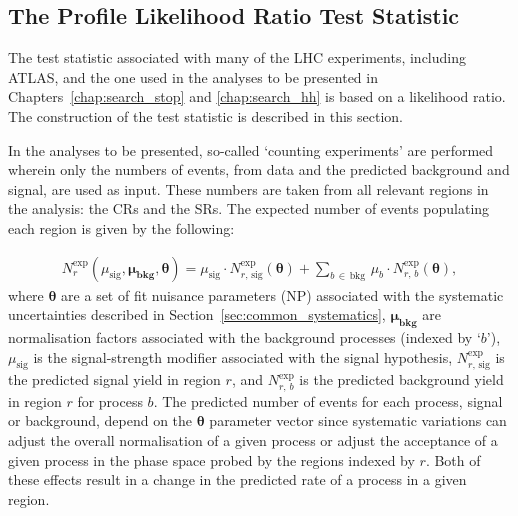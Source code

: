 %
%

\subsection{The Profile Likelihood Ratio Test Statistic}
\label{sec:likelihood}

The test statistic associated with many of the LHC experiments, including ATLAS,
and the one used in the analyses to be presented in Chapters~\ref{chap:search_stop} and
\ref{chap:search_hh} is based on a likelihood ratio.
The construction of the test statistic is described in this section.

In the analyses to be presented, so-called `counting experiments' are performed wherein
only the numbers of events, from data and the predicted background and signal,
are used as input.
These numbers are taken from all relevant regions in the analysis: the CRs and the SRs.
The expected number of events populating each region is given by the following:

\begin{align}
    N_r^\text{exp}(\mu_{\text{sig}}, \bm{\mu_{\text{bkg}}}, \bm{\theta}) = \mu_{\text{sig}} \cdot N_{r,\,\text{sig}}^{\text{exp}}(\bm{\theta}) + \sum\limits_{b\,\in \,\text{bkg}} \, \mu_b \cdot N_{r,\,b}^{\text{exp}}(\bm{\theta}),
    \label{eq:test_stat_n_r}
\end{align}
where $\bm{\theta}$ are a set of fit nuisance parameters (NP) associated with the systematic
uncertainties described in Section~\ref{sec:common_systematics},
$\bm{\mu_{\text{bkg}}}$ are normalisation factors associated with the background processes (indexed by `$b$'),
$\mu_{\text{sig}}$ is the signal-strength modifier associated with the signal hypothesis,
$N_{r,\,\text{sig}}^{\text{exp}}$ is the predicted signal yield in region $r$,
and $N_{r,\,b}^{\text{exp}}$ is the predicted background yield in region $r$ for process $b$.
The predicted number of events for each process, signal or background, depend on the $\bm{\theta}$ parameter vector
since systematic variations can adjust the overall normalisation of a given process or adjust
the acceptance of a given process in the phase space probed by the regions indexed by $r$.
Both of these effects result in a change in the predicted rate of a process in a given region.

